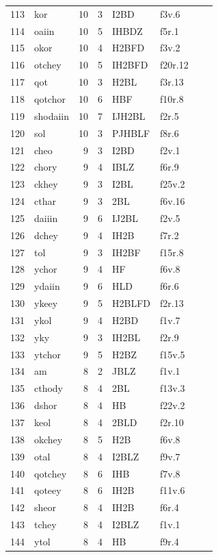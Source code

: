 \documentclass[11pt,a4paper]{article}
\begin{document}
\begin{landscape}
\begin{longtable}{@{}r>{\ttfamily}lrrl>{\ttfamily}l>{\raggedright\arraybackslash}p{80mm}>{\raggedright\arraybackslash}p{36mm}@{}}
113 & kor & 10 & 3 & I2BD & f3v.6 &  & \\
114 & oaiin & 10 & 5 & IHBDZ & f5r.1 &  & \\
115 & okor & 10 & 4 & H2BFD & f3v.2 &  & \\
116 & otchey & 10 & 5 & IH2BFD & f20r.12 &  & \\
117 & qot & 10 & 3 & H2BL & f3r.13 &  & \\
118 & qotchor & 10 & 6 & HBF & f10r.8 &  & \\
119 & shodaiin & 10 & 7 & IJH2BL & f2r.5 &  & \\
120 & sol & 10 & 3 & PJHBLF & f8r.6 &  & \\
121 & cheo & 9 & 3 & I2BD & f2v.1 &  & \\
122 & chory & 9 & 4 & IBLZ & f6r.9 &  & \\
123 & ckhey & 9 & 3 & I2BL & f25v.2 &  & \\
124 & cthar & 9 & 3 & 2BL & f6v.16 &  & \\
125 & daiiin & 9 & 6 & IJ2BL & f2v.5 &  & \\
126 & dchey & 9 & 4 & IH2B & f7r.2 &  & \\
127 & tol & 9 & 3 & IH2BF & f15r.8 &  & \\
128 & ychor & 9 & 4 & HF & f6v.8 &  & \\
129 & ydaiin & 9 & 6 & HLD & f6r.6 &  & \\
130 & ykeey & 9 & 5 & H2BLFD & f2r.13 &  & \\
131 & ykol & 9 & 4 & H2BD & f1v.7 &  & \\
132 & yky & 9 & 3 & IH2BL & f2r.9 &  & \\
133 & ytchor & 9 & 5 & H2BZ & f15v.5 &  & \\
134 & am & 8 & 2 & JBLZ & f1v.1 &  & \\
135 & cthody & 8 & 4 & 2BL & f13v.3 &  & \\
136 & dshor & 8 & 4 & HB & f22v.2 &  & \\
137 & keol & 8 & 4 & 2BLD & f2r.10 &  & \\
138 & okchey & 8 & 5 & H2B & f6v.8 &  & \\
139 & otal & 8 & 4 & I2BLZ & f9v.7 &  & \\
140 & qotchey & 8 & 6 & IHB & f7v.8 &  & \\
141 & qoteey & 8 & 6 & IH2B & f11v.6 &  & \\
142 & sheor & 8 & 4 & IH2B & f6r.4 &  & \\
143 & tchey & 8 & 4 & I2BLZ & f1v.1 &  & \\
144 & ytol & 8 & 4 & HB & f9r.4 &  & \\

\end{longtable}
\end{landscape}
\end{document}
